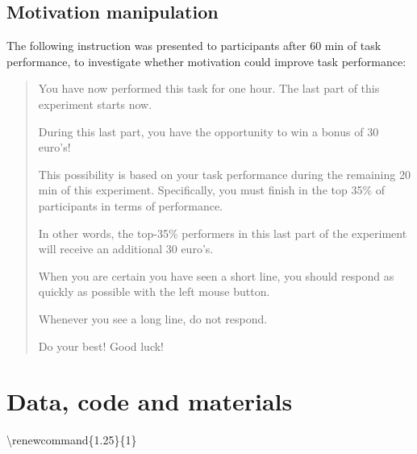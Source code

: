 \documentclass[11pt,english,]{memoir}
\begin{document}
\hypertarget{motivation-manipulation}{%
\section{Motivation manipulation}\label{motivation-manipulation}}

The following instruction was presented to participants after 60 min of task performance, to investigate whether motivation could improve task performance:

\begin{quote}
You have now performed this task for one hour. The last part of this experiment starts now.

During this last part, you have the opportunity to win a bonus of 30 euro's!

This possibility is based on your task performance during the remaining 20 min of this experiment. Specifically, you must finish in the top 35\% of participants in terms of performance.

In other words, the top-35\% performers in this last part of the experiment will receive an additional 30 euro's.

When you are certain you have seen a short line, you should respond as quickly as possible with the left mouse button.

Whenever you see a long line, do not respond.

Do your best! Good luck!
\end{quote}

\hypertarget{resources-supplement}{%
\chapter{Data, code and materials}\label{resources-supplement}}

\vspace{-12pt}

\begingroup

\textbackslash{}renewcommand\{1.25\}\{1\}
\setlength{\tabcolsep}{0pt}
\setlength{\LTleft}{-20cm plus -1fill}
\setlength{\LTright}{\LTleft}
\footnotesize
\end{document}

